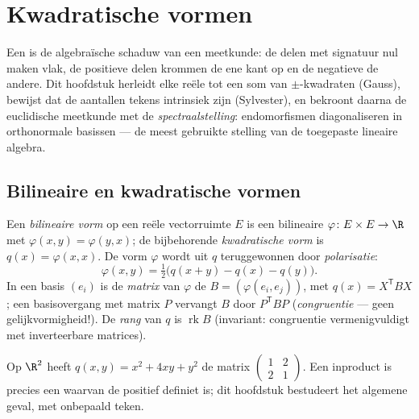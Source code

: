 \chapter{Kwadratische vormen}\label{ch:b2:quadratic}

Een  is de algebraïsche schaduw van een meetkunde:
de delen met signatuur nul maken vlak, de positieve delen krommen
de ene kant op en de negatieve de andere. Dit hoofdstuk herleidt
elke reële  tot een som van $\pm$-kwadraten
(Gauss), bewijst dat de aantallen tekens intrinsiek zijn
(Sylvester), en bekroont daarna de euclidische meetkunde met de
\emph{spectraalstelling}:  endomorfismen
diagonaliseren in orthonormale basissen --- de meest gebruikte
stelling van de toegepaste lineaire algebra.

\section{Bilineaire en kwadratische vormen}

\begin{definition}\label{def:b2:quadratic:def}
Een \emph{ bilineaire vorm} op een reële vectorruimte
$E$ is een bilineaire $\varphi \colon E \times E \to \R$ met
$\varphi(x, y) = \varphi(y, x)$; de bijbehorende \emph{kwadratische
vorm} is $q(x) = \varphi(x, x)$. De vorm
$\varphi$ wordt uit $q$ teruggewonnen door
\emph{polarisatie}:
\[
\varphi(x, y) = \tfrac12\bigl(q(x + y) - q(x) - q(y)\bigr).
\]
In een basis $(e_i)$ is de \emph{matrix} van $\varphi$ de
 $B = (\varphi(e_i, e_j))$, met $q(x) = X^{\mathsf T} B
X$; een basisovergang met matrix $P$ vervangt $B$ door $P^{\mathsf
T} B P$ (\emph{congruentie} --- geen
gelijkvormigheid!). De \emph{rang} van $q$ is $\operatorname{rk}
B$ (invariant: congruentie vermenigvuldigt met inverteerbare
matrices).
\end{definition}

\begin{example}
Op $\R^2$ heeft $q(x, y) = x^2 + 4xy + y^2$ de matrix
$\begin{pmatrix} 1 & 2\\ 2 & 1\end{pmatrix}$. Een inproduct is
precies een  waarvan de  positief definiet is; dit hoofdstuk bestudeert het algemene
geval, met onbepaald teken.
\end{example}

